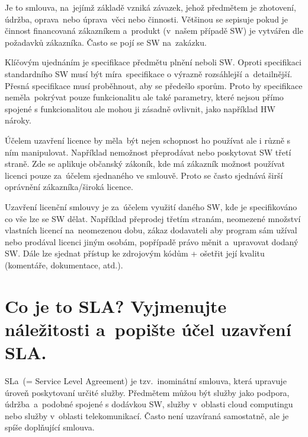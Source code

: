 Je to smlouva, na~jejímž základě vzniká závazek, jehož předmětem je zhotovení, údržba, oprava~nebo úprava~věci nebo činnosti. Většinou se sepisuje pokud je činnost financovaná zákazníkem a~produkt (v~našem případě SW) je vytvářen dle požadavků zákazníka. Často se pojí se SW na~zakázku.

Klíčovým ujednáním je specifikace předmětu plnění neboli SW\@. Oproti specifikaci standardního SW musí být míra~specifikace o výrazně rozsáhlejší a~detailnější. Přesná specifikace musí proběhnout, aby se předešlo sporům. Proto by specifikace neměla~pokrývat pouze funkcionalitu ale také parametry, které nejsou přímo spojené s funkcionalitou ale mohou ji zásadně ovlivnit, jako například HW nároky.

Účelem uzavření licence by měla~být nejen schopnost ho používat ale i různě s ním manipulovat. Například nemožnost přeprodávat nebo poskytovat SW třetí straně. Zde se aplikuje občanský zákoník, kde má zákazník možnost používat licenci pouze za~účelem sjednaného ve smlouvě. Proto se často sjednává širší oprávnění zákazníka/široká licence. 

Uzavření licenční smlouvy je za~účelem využití daného SW, kde je specifikováno co vše lze se SW dělat. Například přeprodej třetím stranám, neomezené množství vlastních licencí na~neomezenou dobu, zákaz dodavateli aby program sám užíval nebo prodával licenci jiným osobám, popřípadě právo měnit a~upravovat dodaný SW. Dále lze sjednat přístup ke zdrojovým kódům + ošetřit její kvalitu (komentáře, dokumentace, atd.).


\newpage
\section{Co je to SLA\@? Vyjmenujte náležitosti a~popište účel uzavření SLA.}

SLa~(= Service Level Agreement) je tzv.\ inominátní smlouva, která upravuje úroveň poskytovaní určité služby. Předmětem můžou být služby jako podpora, údržba~a~podobné spojené s dodávkou SW, služby v~oblasti cloud computingu nebo služby v~oblasti telekomunikací. Často není uzavíraná samostatně, ale je spíše doplňující smlouva.
\newline

